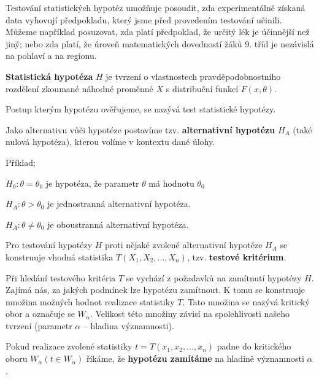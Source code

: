 \begin{compactitem}
    \item Testování statistických hypotéz umožňuje posoudit, zda experimentálně získaná data vyhovují předpokladu, který jsme před provedením testování učinili. Můžeme například posuzovat, zda platí předpoklad, že určitý lék je účinnější než jiný; nebo zda platí, že úroveň matematických dovedností žáků 9. tříd je nezávislá na pohlaví a na regionu.

    \item \textbf{Statistická hypotéza} $H$ je tvrzení o vlastnostech pravděpodobnostního rozdělení zkoumané náhodné proměnné $X$ s distribuční funkcí $F(x, \theta)$. \begin{compactitem}
        \item Postup kterým hypotézu ověřujeme, se nazývá test statistické hypotézy.
    \end{compactitem}

    \item Jako alternativu vůči hypotéze postavíme tzv. \textbf{alternativní hypotézu} $H_A$ (také nulová hypotéza), kterou volíme v kontextu dané úlohy. \begin{compactitem}
        \item Příklad;
        \item $H_0 : \theta = \theta_0$ je  hypotéza, že parametr $\theta$ má hodnotu $\theta_0$
        \item $H_A : \theta > \theta_0$ je jednostranná alternativní hypotéza.
        \item $H_A : \theta \not= \theta_0$ je oboustranná alternativní hypotéza.
    \end{compactitem}

    \item Pro testování hypotézy $H$ proti nějaké zvolené alternativní hypotéze $H_A$ se konstruuje vhodná statistika $T(X_1, X_2, \ldots, X_n)$, tzv. \textbf{testové kritérium}.

    \item Při hledání testového kritéria $T$ se vychází z požadavků na zamítnutí hypotézy $H$. Zajímá nás, za jakých podmínek lze hypotézu zamítnout. K tomu se konstruuje množina možných hodnot realizace statistiky $T$. Tato množina se nazývá kritický obor a označuje se $W_{\alpha}$. Velikost této množiny závisí na spolehlivosti našeho tvrzení (parametr $\alpha$ -- hladina významnosti). \begin{compactitem}
        \item Pokud realizace zvolené statistiky $t = T(x_1, x_2, \ldots, x_n)$ padne do kritického oboru $W_{\alpha}(t \in W_{\alpha})$ říkáme, že \textbf{hypotézu zamítáme} na hladině významnosti $\alpha$.
    \end{compactitem}


\end{compactitem}
